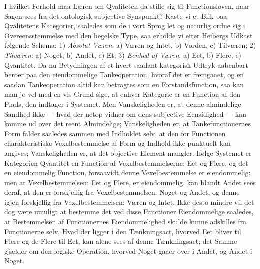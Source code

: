 \documentclass[12pt]{book}
\newcommand{\opage}[1]{\marginnote{\footnotesize\textit{[#1]}}}
\begin{document}
I hvilket Forhold maa Læren om Qvaliteten da stille sig til Functionsloven, naar Sagen sees fra det
ontologisk subjective Synspunkt? Kaste vi et Blik paa Qvalitetens Kategorier, saaledes som de i vort
Sprog let og naturlig ordne sig i Overeensstemmelse med den hegelske Type, saa erholde vi efter
Heibergs Udkast følgende Schema: 1) \emph{Absolut Væren}: a) Væren og Intet, b) Vorden, c) Tilværen;
2) \emph{Tilværen}: a) Noget, b) Andet, c) Et; 3) \emph{Eenhed af Væren}: a) Eet, b) Flere,
c) Qvantitet. Da nu Betydningen af et%
\opage{291} hvert saadant kategorisk Udtryk aabenbart beroer paa den eiendommelige Tankeoperation, hvoraf det er
fremgaaet, og en saadan Tankeoperation altid kan betragtes som en Forstandsfunction, saa kan man jo vel
med en vis Grund sige, at enhver Kategorie er en Function af den Plads, den indtager i Systemet. Men
Vanskeligheden er, at denne almindelige Sandhed ikke --- hvad der netop vidner om dens subjective
Eensidighed --- kan komme ud over det reent Almindelige; Vanskeligheden er, at Tankefunctionernes Form
falder saaledes sammen med Indholdet selv, at den for Functionen charakteristiske Vexelbestemmelse af
Form og Indhold ikke punktuelt kan angives; Vanskeligheden er, at det objective Element mangler. Ifølge
Systemet er Kategorien Qvantitet en Function af Vexelbestemmelserne: Eet og Flere, og det en
eiendommelig Function, forsaavidt denne Vexelbestemmelse er eiendommelig; men at Vexelbestemmelsen: Eet
og Flere, er eiendommelig, kan blandt Andet sees deraf, at den er forskjellig fra Vexelbestemmelsen:
Noget og Andet, og denne igjen forskjellig fra Vexelbestemmelsen: Væren og Intet. Ikke desto mindre vil
det dog være umuligt at bestemme det ved disse Functioner Eiendommelige saaledes, at Bestemmelsen af
Functionernes Eiendommelighed skulde kunne adskilles fra Functionerne selv. Hvad der ligger i den
Tænkningsact, hvorved Eet bliver til Flere og de Flere til Eet, kan alene sees af denne Tænkningsact;
det Samme gjælder om den logiske Operation, hvorved Noget gaaer over i Andet, og Andet i Noget.
\end{document}
